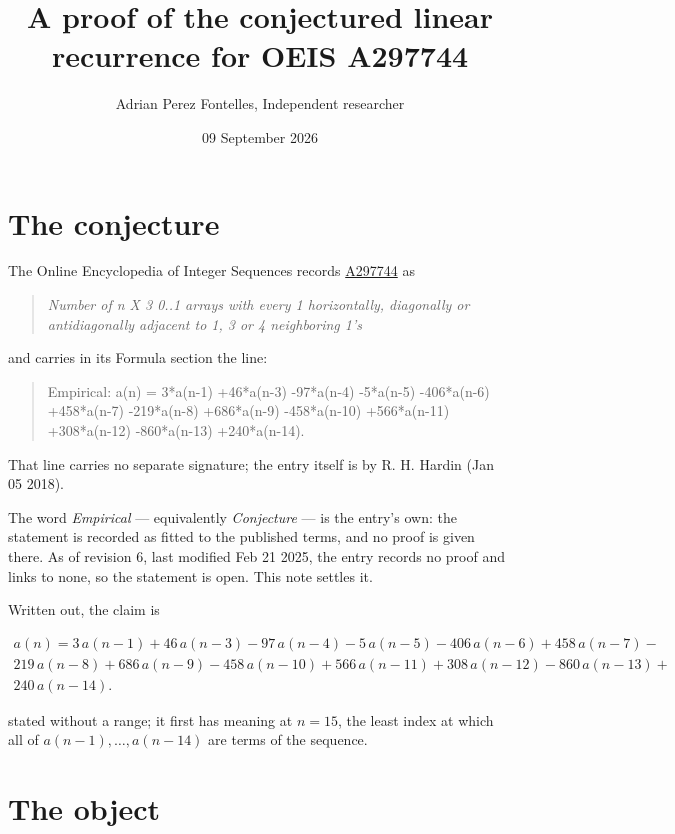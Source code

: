 \documentclass[11pt]{article}
\title{A proof of the conjectured linear recurrence for OEIS A297744}
\author{Adrian Perez Fontelles, Independent researcher}
\date{09 September 2026}
\theoremstyle{definition}
\begin{document}
\maketitle
\section{The conjecture}

The Online Encyclopedia of Integer Sequences records \href{https://oeis.org/A297744}{A297744} as

\begin{quote}\itshape Number of n X 3 0..1 arrays with every 1 horizontally, diagonally or antidiagonally adjacent to 1, 3 or 4 neighboring 1's\end{quote}

and carries in its Formula section the line:

\begin{quote}\ttfamily Empirical: a(n) = 3*a(n-1) +46*a(n-3) -97*a(n-4) -5*a(n-5) -406*a(n-6) +458*a(n-7) -219*a(n-8) +686*a(n-9) -458*a(n-10) +566*a(n-11) +308*a(n-12) -860*a(n-13) +240*a(n-14).\end{quote}

That line carries no separate signature; the entry itself is by R. H. Hardin (Jan 05 2018).

The word {\itshape Empirical} --- equivalently {\itshape Conjecture} --- is the entry's own: the statement is recorded as fitted to the published terms, and no proof is given there. As of revision 6, last modified Feb 21 2025, the entry records no proof and links to none, so the statement is open. This note settles it.

Written out, the claim is

\begin{multline*} a(n) = 3\,a(n-1) + 46\,a(n-3) - 97\,a(n-4) - 5\,a(n-5) - 406\,a(n-6) + 458\,a(n-7) - \\ 219\,a(n-8) + 686\,a(n-9) - 458\,a(n-10) + 566\,a(n-11) + 308\,a(n-12) - 860\,a(n-13) + \\ 240\,a(n-14). \end{multline*}

stated without a range; it first has meaning at $n = 15$, the least index at which all of $a(n-1),\dots,a(n-14)$ are terms of the sequence.

\section{The object}
\end{document}
